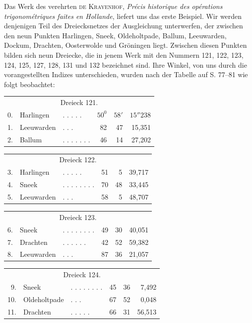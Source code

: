 Das Werk des verehrten \textsc{de Krayenhof}, \textit{Précis historique des opérations trigonométriques faites en Hollande}, liefert uns das erste Beispiel. Wir werden denjenigen Teil des Dreiecksnetzes der Ausgleichung unterwerfen, der zwischen den neun Punkten Harlingen, Sneek, Oldeholtpade, Ballum, Leeuwarden, Dockum, Drachten, Oosterwolde und Gröningen liegt. Zwischen diesen Punkten bilden sich neun Dreiecke, die in jenem Werk mit den Nummern 121, 122, 123, 124, 125, 127, 128, 131 und 132 bezeichnet sind. Ihre Winkel, von uns durch die vorangestellten Indizes unterschieden, wurden nach der Tabelle auf S. 77–81 wie folgt beobachtet:
\begin{center}
\begin{tabular}{r l l r r r}
\multicolumn{6}{c}{Dreieck 121.}\\[5pt]
0.&Harlingen&. . . . .&\(50^0\)&\(58'\)&\(15''238\)\\
1.&Leeuwarden&. . .&82&47&15,351\\
2.&Ballum&. . . . . . .&46&14&27,202
\end{tabular}
\end{center}
\begin{center}
\begin{tabular}{r l l r r r}
\multicolumn{6}{c}{Dreieck 122.}\\[5pt]
3.&Harlingen&. . . . .&51&5&39,717\\
4.&Sneek&. . . . . . . .&70&48&33,445\\
5.&Leeuwarden&. . .&58&5&48,707
\end{tabular}
\end{center}
\begin{center}
\begin{tabular}{r l l r r r}
\multicolumn{6}{c}{Dreieck 123.}\\[5pt]
6.&Sneek&. . . . . . . .&49&30&40,051\\
7.&Drachten&. . . . . .&42&52&59,382\\
8.&Leeuwarden&. . .&87&36&21,057
\end{tabular}
\end{center}
\begin{center}
\begin{tabular}{r l l r r r}
\multicolumn{6}{c}{Dreieck 124.}\\[5pt]
9.&Sneek&. . . . . . . .&45&36&7,492\\
10.&Oldeholtpade&. . .&67&52&0,048\\
11.&Drachten&. . . . .&66&31&56,513
\end{tabular}
\end{center}
